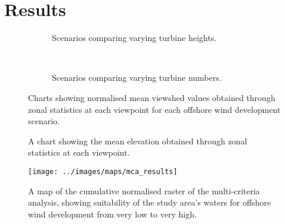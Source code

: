 \chapter{Results}

\begin{figure}
  \centering
  \begin{subfigure}[t]{.9\textwidth}
    \caption*{Scenarios comparing varying turbine heights.}
  \end{subfigure}
  \\[.2cm]
  \begin{subfigure}[t]{.9\textwidth}
    \caption*{Scenarios comparing varying turbine numbers.}
  \end{subfigure}
  \caption{Charts showing normalised mean viewshed values obtained through zonal
  statistics at each viewpoint for each offshore wind development scenario. \label{fig:zs_scenarios}}
\end{figure}

\begin{figure}
  \centering
  \caption{A chart showing the mean elevation obtained through zonal statistics at each viewpoint. \label{fig:zs_elevation}}
\end{figure}

\begin{figure}
  \centering
  \texttt{[image: ../images/maps/mca\_results]}
  \caption{A map of the cumulative normalised raster of the multi-criteria
  analysis, showing suitability of the study area's waters for
  offshore wind development from very low to very high. \label{fig:mca_results}}
\end{figure}

